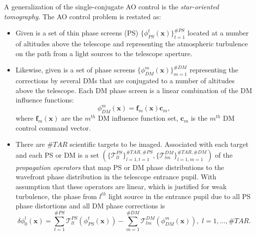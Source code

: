 \mbox{}

A generalization of the single-conjugate AO control is the \emph{star-oriented
tomography}.  The AO control problem is
restated as:
\begin{itemize}
  \item Given is a set of thin phase screens (PS)
  $\{ \phi^{t}_{PS}(\bm{x}) \}_{t=1}^{\#PS}$
  located at a number of altitudes above the telescope and representing the
  atmospheric
  turbulence on the path from a light sources to the telescope aperture.

  \item Likewise, given is a set of phase screens $\{ \phi^{m}_{DM}(\bm{x})
  \}_{m=1}^{\#DM}$ representing the corrections by several DMs that are
  conjugated to a number of altitudes above the telescope. Each DM phase
  screen is a linear combination of the DM influence functions:
	\begin{equation} \label{eq:mcao-dm-inf}
		\phi^{m}_{DM}(\bm{x}) = \bm{f}_{m} (\bm{x}) \bm{c}_{m},
	\end{equation}
	where $\bm{f}_{m} (\bm{x})$ are the $m^{th}$ DM influence function set,
	$\bm{c}_{m}$ is the $m^{th}$ DM control command vector.

  \item There are $\#TAR$ scientific targets to be imaged. Associated with
  each target and each PS or DM is a set
  $( \{ \mathcal{T}^{PS}_{lt} \}_{l=1,t=1}^{\#TAR,\#PS},
     \{ \mathcal{T}^{DM}_{lm} \}_{l=1,m=1}^{\#TAR,\#DM} )$
  of the \emph{propagation operators}
   that map PS or DM phase distributions to the
  wavefront phase distribution in the telescope entrance pupil. With
  assumption that these operators are linear, which is justified for weak
  turbulence, the phase from $l^{th}$ light source in the entrance pupil due to
  all PS phase distortions and all DM phase corrections is
  \begin{equation} \label{eq:mcao-pupil-phase}
    \delta \phi^{l}_{0}(\bm{x}) =
    \sum_{t=1}^{\#PS}
    \mathcal{T}^{PS}_{lt}(\phi_{PS}^{t}(\bm{x})) -
    \sum_{m=1}^{\#DM}
    \mathcal{T}^{DM}_{lm}(\phi_{DM}^{m}(\bm{x})),
    \,\, l = 1,...,\#TAR.
	\end{equation}


\end{itemize}
